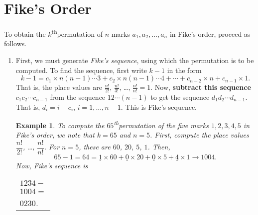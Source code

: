 \documentclass[svgnames]{article}
\renewcommand{\th}{\textsuperscript{th}}
\newtheorem{Example}{Example}
\begin{document}
\section{Fike's Order}
To obtain the $k$\th permutation of $n$ marks $a_1, a_2, \ldots, a_n$ in Fike's order, proceed as follows.
\begin{enumerate}
\item First, we must generate \emph{Fike's sequence}, using which the permutation is to be computed. To find the sequence, first write $k - 1$ in the form
\begin{equation*}
k - 1 = c_1  \times n(n-1) \cdots 3 + c_2  \times n(n-1) \cdots 4 + \cdots + c_{n-2} \times n + c_{n-1} \times 1.
\end{equation*}
That is, the place values are $\frac {n!} {2!}$, $\frac {n!} {3!}$, \ldots, $\frac {n!} {n!} = 1$. Now, \textbf{subtract this sequence} $c_1 c_2 \cdots c_{n-1}$ from the sequence $1 2 \cdots (n - 1)$ to get the sequence $d_1 d_2 \cdots d_{n-1}$. That is, $d_i = i - c_i$, $i = 1, \ldots, n - 1$. This is Fike's sequence.

\begin{Example}
To compute the $65$\th permutation of the five marks $1, 2, 3, 4, 5$ in Fike's order, we note that $k = 65$ and $n = 5$. First, compute the place values $\dfrac{n!}{2!}$, \ldots, $\dfrac{n!}{n!}$. For $n = 5$, these are $60$, $20$, $5$, $1$. Then,
\begin{equation*}
65 - 1 = 64 = \underline 1 \times 60 + \underline 0 \times 20 + \underline 0 \times 5 + \underline 4 \times 1 \to 1004.
\end{equation*}
Now, Fike's sequence is\\
\begin{tabular}{l}
$1234 - {}$\\
$1004 = {}$\\
\hline
$0230$.
\end{tabular}
\end{Example}


\end{enumerate}
\end{document}
